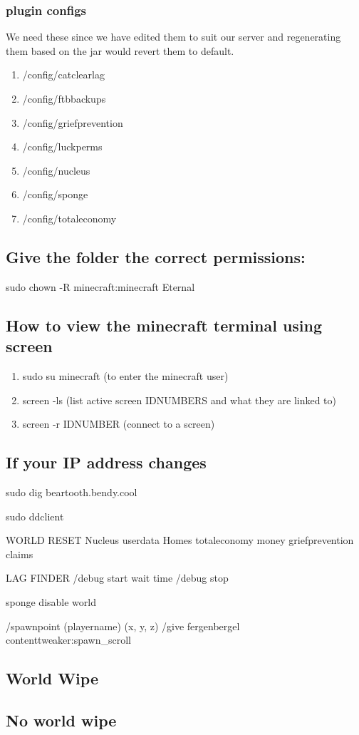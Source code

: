 \documentclass{article}
\begin{document}
\subsubsection{plugin configs}
We need these since we have edited them to suit our server and regenerating them based on the jar would revert them to default.
\begin{enumerate}
	\item /config/catclearlag
	\item /config/ftbbackups
	\item /config/griefprevention
	\item /config/luckperms
	\item /config/nucleus
	\item /config/sponge
	\item /config/totaleconomy
\end{enumerate}

\subsection{Give the folder the correct permissions:}
sudo chown -R minecraft:minecraft Eternal

\subsection{How to view the minecraft terminal using screen}

\begin{enumerate}
	\item sudo su minecraft   (to enter the minecraft user)
	\item screen -ls		  (list active screen IDNUMBERS and what they are linked to)
	\item screen -r IDNUMBER  (connect to a screen)
\end{enumerate}
 
 
\subsection{If your IP address changes}

sudo dig beartooth.bendy.cool

sudo ddclient


WORLD RESET
Nucleus userdata Homes
totaleconomy money
griefprevention claims

LAG FINDER
/debug start
wait time
/debug stop

sponge disable world

/spawnpoint (playername)  (x, y, z)
/give fergenbergel contenttweaker:spawn\_scroll



\subsection{World Wipe}

\subsection{No world wipe}
\end{document}
